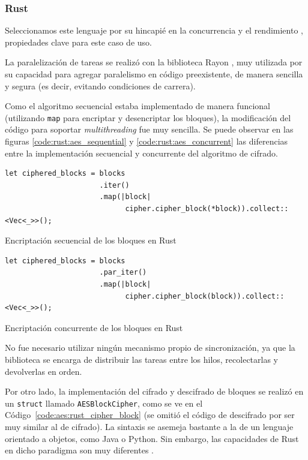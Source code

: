 \documentclass[11pt]{article}
\let\Oldsubsubsection\subsubsection
\renewcommand{\subsubsection}{\FloatBarrier\Oldsubsubsection}
\newcommand{\english}[1]{\textit{#1}}
\begin{document}
\subsubsection{Rust}

Seleccionamos este lenguaje por su hincapié en la concurrencia \cite{rust:ex:fearless_concurrency} y el rendimiento \cite{com:rust}, propiedades clave para este caso de uso.

La paralelización de tareas se realizó con la biblioteca Rayon \cite{aes:rayon}, muy utilizada por su capacidad para agregar paralelismo en código preexistente, de manera sencilla y segura (es decir, evitando condiciones de carrera).

Como el algoritmo secuencial estaba implementado de manera funcional (utilizando \lstinline{map} para encriptar y desencriptar los bloques), la modificación del código para soportar \english{multithreading} fue muy sencilla. Se puede observar en las figuras \ref{code:rust:aes_sequential} y \ref{code:rust:aes_concurrent} las diferencias entre la implementación secuencial y concurrente del algoritmo de cifrado.

\begin{listing}[h]
\begin{verbatim}
let ciphered_blocks = blocks
                      .iter()
                      .map(|block|
                            cipher.cipher_block(*block)).collect::<Vec<_>>();
\end{verbatim}
\caption{Encriptación secuencial de los bloques en Rust}
\label{code:rust:aes_sequential}
\end{listing}

\begin{listing}[h]
\begin{verbatim}
let ciphered_blocks = blocks
                      .par_iter()
                      .map(|block|
                            cipher.cipher_block(block)).collect::<Vec<_>>();
\end{verbatim}
\caption{Encriptación concurrente de los bloques en Rust}
\label{code:rust:aes_concurrent}
\end{listing}

No fue necesario utilizar ningún mecanismo propio de sincronización, ya que la biblioteca se encarga de distribuir las tareas entre los hilos, recolectarlas y devolverlas en orden.

Por otro lado, la implementación del cifrado y descifrado de bloques se realizó en un \lstinline{struct} llamado \lstinline{AESBlockCipher}, como se ve en el Código~\ref{code:aes:rust_cipher_block} (se omitió el código de descifrado por ser muy similar al de cifrado). La sintaxis se asemeja bastante a la de un lenguaje orientado a objetos, como Java o Python. Sin embargo, las capacidades de Rust en dicho paradigma son muy diferentes \cite{aes:rust_oop}.
\end{document}
